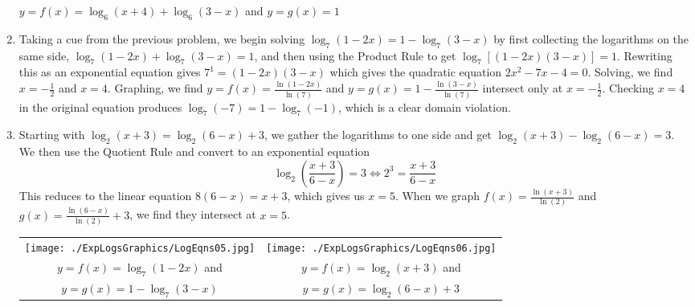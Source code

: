 \begin{ex}
\begin{enumerate}
\begin{center}
$y = f(x) =\log_{6}(x+4) + \log_{6}(3-x)$ and  \boldmath  $y=g(x) = 1$

\end{center}

\item  Taking a cue from the previous problem, we begin solving $\log_{7}(1-2x) = 1 - \log_{7}(3-x)$ by first collecting the logarithms on the same side, $\log_{7}(1-2x) +  \log_{7}(3-x) = 1$, and then using the Product Rule to get $\log_{7}[(1-2x)(3-x)] = 1$.  Rewriting this as an exponential equation gives $7^{1} = (1-2x)(3-x)$ which gives the quadratic equation $2x^2-7x-4=0$.  Solving, we find  $x = -\frac{1}{2}$ and $x=4$.  Graphing, we find $y = f(x) = \frac{\ln(1-2x)}{\ln(7)}$ and $y=g(x) = 1 - \frac{\ln(3-x)}{\ln(7)}$ intersect only at $x=-\frac{1}{2}$.  Checking $x=4$ in the original equation produces $\log_{7}(-7) = 1 - \log_{7}(-1)$, which is a clear domain violation.

\item Starting with  $\log_{2}(x+3) = \log_{2}(6-x)+3$, we gather the logarithms to one side and get $\log_{2}(x+3) - \log_{2}(6-x) = 3$.  We then use the Quotient Rule and convert to an exponential equation \[\log_{2}\left(\frac{x+3}{6-x}\right) = 3 \iff 2^{3} = \frac{x+3}{6-x} \] This reduces to the linear equation $8(6-x) = x+3$, which gives us $x = 5$.  When we graph $f(x) = \frac{\ln(x+3)}{\ln(2)}$ and $g(x) =  \frac{\ln(6-x)}{\ln(2)} + 3$, we find they intersect at $x=5$.

\begin{center}

\begin{tabular}{cc}

\texttt{[image: ./ExpLogsGraphics/LogEqns05.jpg]} &

\hspace{0.75in} \texttt{[image: ./ExpLogsGraphics/LogEqns06.jpg]} \\

$y = f(x) =\log_{7}(1-2x)$ and   & 

 \hspace{0.75in}  $y = f(x) =  \log_{2}(x+3)$ and \\
 
 \boldmath $y=g(x)=1 - \log_{7}(3-x)$ & 
 \hspace{0.75in} \boldmath $y=g(x) = \log_{2}(6-x)+3$  \\

\end{tabular}


\end{center}
\end{enumerate}
\end{ex}
